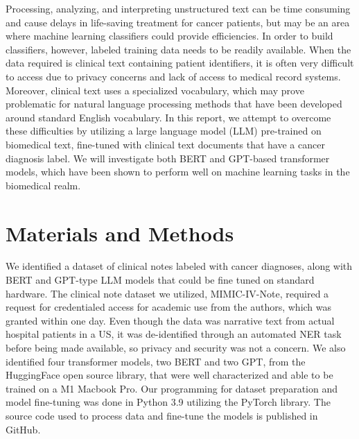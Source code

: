 \documentclass[manuscript,screen,review,nonacm]{acmart}
\begin{document}
	Processing, analyzing, and interpreting unstructured text can be time consuming and cause delays in life-saving treatment for cancer patients, but may be an area where machine learning classifiers could provide efficiencies. In order to build classifiers, however, labeled training data needs to be readily available. When the data required is clinical text containing patient identifiers, it is often very difficult to access due to privacy concerns and lack of access to medical record systems. Moreover, clinical text uses a specialized vocabulary, which may prove problematic for natural language processing methods that have been developed around standard English vocabulary. In this report, we attempt to overcome these difficulties by utilizing a large language model (LLM) pre-trained on biomedical text, fine-tuned with clinical text documents that have a cancer diagnosis label. We will investigate both BERT\cite{devlin2018bert} and GPT\cite{radford2018improving}-based transformer\cite{vaswani2017attention} models, which have been shown to perform well on machine learning tasks in the biomedical realm\cite{wada2020pre}\cite{bbac409}.
	


\section{Materials and Methods}
We identified a dataset of clinical notes labeled with cancer diagnoses, along with BERT and GPT-type LLM models that could be fine tuned on standard hardware. The clinical note dataset we utilized, MIMIC-IV-Note\cite{johnson2022mimic}, required a request for credentialed access for academic use from the authors, which was granted within one day. Even though the data was narrative text from actual hospital patients in a US, it was de-identified through an automated NER task\cite{johnson2020deidentification} before being made available, so privacy and security was not a concern. We also identified four transformer models, two BERT and two GPT, from the HuggingFace open source library, that were well characterized and able to be trained on a M1 Macbook Pro. Our programming for dataset preparation and model fine-tuning was done in Python 3.9 utilizing the PyTorch library\cite{paszke2019pytorch}. The source code used to process data and fine-tune the models is published in GitHub\cite{cs685}.
\end{document}
